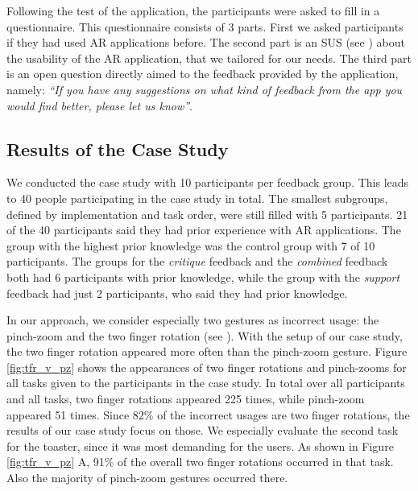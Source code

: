 \documentclass[11pt, a4paper]{article}
\begin{document}
			Following the test of the application, the participants were asked to fill in a questionnaire. This questionnaire consists of 3 parts. First we asked participants if they had used \ac{AR} applications before. The second part is an \ac{SUS} (see ) about the usability of the \ac{AR} application, that we tailored for our needs. The third part is an open question directly aimed to the feedback provided by the application, namely: \emph{``If you have any suggestions on what kind of feedback from the app you would find better, please let us know''}.

		\subsection*{Results of the Case Study}\label{ssec:results}

			We conducted the case study with 10 participants per feedback group. This leads to 40 people participating in the case study in total. The smallest subgroups, defined by implementation and task order, were still filled with 5 participants. 21 of the 40 participants said they had prior experience with \ac{AR} applications. The group with the highest prior knowledge was the control group with 7 of 10 participants. The groups for the \emph{critique} feedback and the \emph{combined} feedback both had 6 participants with prior knowledge, while the group with the \emph{support} feedback had just 2 participants, who said they had prior knowledge.

			In our approach, we consider especially two gestures as incorrect usage: the pinch-zoom and the two finger rotation (see ). With the setup of our case study, the two finger rotation appeared more often than the pinch-zoom gesture. Figure \ref{fig:tfr_v_pz} shows the appearances of two finger rotations and pinch-zooms for all tasks given to the participants in the case study. In total over all participants and all tasks, two finger rotations appeared 225 times, while pinch-zoom appeared 51 times. Since 82\% of the incorrect usages are two finger rotations, the results of our case study focus on those. We especially evaluate the second task for the toaster, since it was most demanding for the users. As shown in Figure \ref{fig:tfr_v_pz} A, 91\% of the overall two finger rotations occurred in that task. Also the majority of pinch-zoom gestures occurred there.
\end{document}
